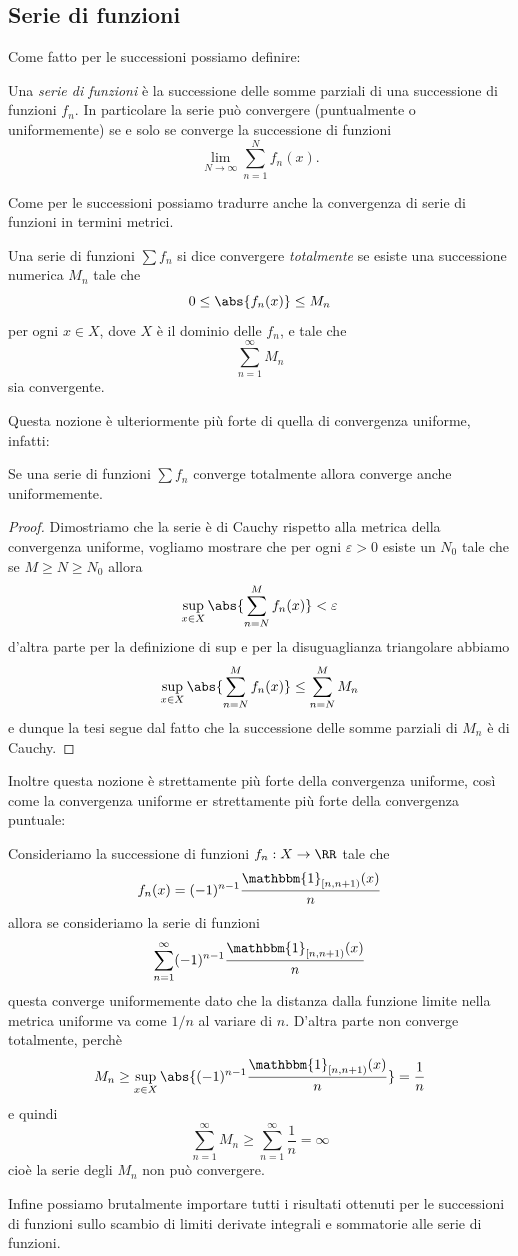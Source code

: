 \documentclass[11pt]{scrartcl}
\begin{document}
	\subsection{Serie di funzioni}
	
	Come fatto per le successioni possiamo definire:
	\begin{definition}
		Una \textit{serie di funzioni} è la successione delle somme parziali di una successione di funzioni $f_n$. In particolare la serie può convergere (puntualmente o uniformemente) se e solo se converge la successione di funzioni
		$$\lim_{N\to\infty}\sum_{n=1}^{N}f_n(x).$$
	\end{definition}
	Come per le successioni possiamo tradurre anche la convergenza di serie di funzioni in termini metrici. 
	\begin{definition}
		Una serie di funzioni $\sum f_n$ si dice convergere \textit{totalmente} se esiste una successione numerica $M_n$ tale che
		$$0\le \abs{f_n(x)}\le M_n$$
		per ogni $x\in X$, dove $X$ è il dominio delle $f_n$, e tale che 
		$$\sum_{n=1}^{\infty}M_n$$
		sia convergente.
	\end{definition}
	Questa nozione è ulteriormente più forte di quella di convergenza uniforme, infatti:
	\begin{proposition}
		Se una serie di funzioni $\sum f_n$ converge totalmente allora converge anche uniformemente.
	\end{proposition}
	\begin{proof}
		Dimostriamo che la serie è di Cauchy rispetto alla metrica della convergenza uniforme, vogliamo mostrare che per ogni $\varepsilon>0$ esiste un $N_0$ tale che se $M\ge N \ge N_0$ allora
		$$\sup_{x\in X}\abs{\sum_{n=N}^{M}f_n(x)}<\varepsilon$$ 
		d'altra parte per la definizione di sup e per la disuguaglianza triangolare abbiamo
		$$\sup_{x\in X}\abs{\sum_{n=N}^{M}f_n(x)}\le \sum_{n=N}^{M}M_n$$
		e dunque la tesi segue dal fatto che la successione delle somme parziali di $M_n$ è di Cauchy.
	\end{proof}
	Inoltre questa nozione è strettamente più forte della convergenza uniforme, così come la convergenza uniforme er strettamente più forte della convergenza puntuale:
	\begin{example}
		Consideriamo la successione di funzioni $f_n:X\to\RR$ tale che
		$$f_n(x)=(-1)^{n-1}\frac{\mathbbm{1}_{[n,n+1)}(x)}{n}$$
		allora se consideriamo la serie di funzioni
		$$\sum_{n=1}^{\infty}(-1)^{n-1}\frac{\mathbbm{1}_{[n,n+1)}(x)}{n}$$
		questa converge uniformemente dato che la distanza dalla funzione limite nella metrica uniforme va come $1/n$ al variare di $n$. D'altra parte non converge totalmente, perchè 
		$$M_n\ge \sup_{x\in X} \abs{(-1)^{n-1}\frac{\mathbbm{1}_{[n,n+1)}(x)}{n}}=\frac{1}{n}$$
		e quindi 
		$$\sum_{n=1}^{\infty}M_n\ge \sum_{n=1}^{\infty}\frac{1}{n}=\infty$$
		cioè la serie degli $M_n$ non può convergere.
	\end{example}
	Infine possiamo brutalmente importare tutti i risultati ottenuti per le successioni di funzioni sullo scambio di limiti derivate integrali e sommatorie alle serie di funzioni.
	
\end{document}
